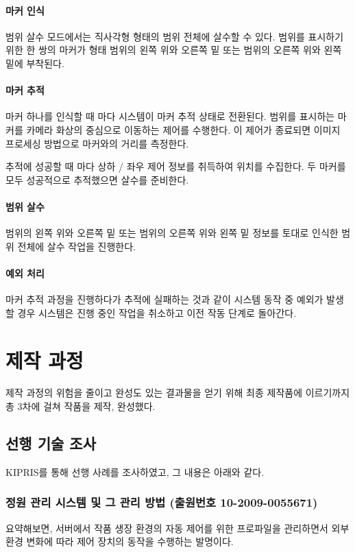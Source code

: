 \documentclass[chapter,11pt,oneside,openany]{xoblivoir}
\begin{document}
\subsubsection{마커 인식}
범위 살수 모드에서는 직사각형 형태의 범위 전체에 살수할 수 있다.
범위를 표시하기 위한 한 쌍의 마커가 형태 범위의 왼쪽 위와 오른쪽 밑 또는 범위의 오른쪽 위와 왼쪽 밑에 부착된다.

\subsubsection{마커 추적}
마커 하나를 인식할 때 마다 시스템이 마커 추적 상태로 전환된다.
범위를 표시하는 마커를 카메라 화상의 중심으로 이동하는 제어를 수행한다.
이 제어가 종료되면 이미지 프로세싱 방법으로 마커와의 거리를 측정한다.

추적에 성공할 때 마다 상하 / 좌우 제어 정보를 취득하여 위치를 수집한다.
두 마커를 모두 성공적으로 추적했으면 살수를 준비한다.

\subsubsection{범위 살수}
범위의 왼쪽 위와 오른쪽 밑 또는 범위의 오른쪽 위와 왼쪽 밑 정보를 토대로
인식한 범위 전체에 살수 작업을 진행한다.

\subsubsection{예외 처리}
마커 추적 과정을 진행하다가 추적에 실패하는 것과 같이 시스템 동작 중
예외가 발생할 경우 시스템은 진행 중인 작업을 취소하고 이전 작동 단계로 돌아간다.


\chapter{제작 과정}

제작 과정의 위험을 줄이고 완성도 있는 결과물을 얻기 위해
최종 제작품에 이르기까지 총 3차에 걸쳐 작품을 제작, 완성했다.

\section{선행 기술 조사}

KIPRIS를 통해 선행 사례를 조사하였고, 그 내용은 아래와 같다.

\subsection[정원 관리 시스템 및 그 관리 방법]{정원 관리 시스템 및 그 관리 방법 (출원번호 10-2009-0055671)}
요약해보면, 서버에서 작품 생장 환경의 자동 제어를 위한 프로파일을 관리하면서 외부 환경 변화에 따라
제어 장치의 동작을 수행하는 발명이다.
\end{document}
